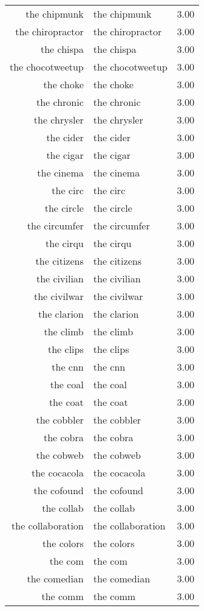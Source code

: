 \begin{table}[ht]
\begin{tabular}{rlr}
  the chipmunk & the chipmunk & 3.00 \\ 
  the chiropractor & the chiropractor & 3.00 \\ 
  the chispa & the chispa & 3.00 \\ 
  the chocotweetup & the chocotweetup & 3.00 \\ 
  the choke & the choke & 3.00 \\ 
  the chronic & the chronic & 3.00 \\ 
  the chrysler & the chrysler & 3.00 \\ 
  the cider & the cider & 3.00 \\ 
  the cigar & the cigar & 3.00 \\ 
  the cinema & the cinema & 3.00 \\ 
  the circ & the circ & 3.00 \\ 
  the circle & the circle & 3.00 \\ 
  the circumfer & the circumfer & 3.00 \\ 
  the cirqu & the cirqu & 3.00 \\ 
  the citizens & the citizens & 3.00 \\ 
  the civilian & the civilian & 3.00 \\ 
  the civilwar & the civilwar & 3.00 \\ 
  the clarion & the clarion & 3.00 \\ 
  the climb & the climb & 3.00 \\ 
  the clips & the clips & 3.00 \\ 
  the cnn & the cnn & 3.00 \\ 
  the coal & the coal & 3.00 \\ 
  the coat & the coat & 3.00 \\ 
  the cobbler & the cobbler & 3.00 \\ 
  the cobra & the cobra & 3.00 \\ 
  the cobweb & the cobweb & 3.00 \\ 
  the cocacola & the cocacola & 3.00 \\ 
  the cofound & the cofound & 3.00 \\ 
  the collab & the collab & 3.00 \\ 
  the collaboration & the collaboration & 3.00 \\ 
  the colors & the colors & 3.00 \\ 
  the com & the com & 3.00 \\ 
  the comedian & the comedian & 3.00 \\ 
  the comm & the comm & 3.00 \\ 

\end{tabular}
\end{table}
